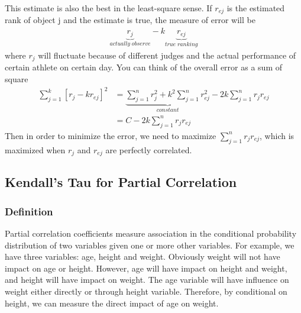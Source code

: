 \documentclass[twoside]{article}
\begin{document}
	This estimate is also the best in the least-square sense. If $r_{ej}$ is the estimated rank of object j and the estimate is true, the measure of error will be
	\begin{align*}
		\underbrace{r_j}_{actually \; observe} - k \underbrace{r_{ej}}_{true \; ranking}
	\end{align*}
	where $r_j$ will fluctuate because of different judges and the actual performance of certain athlete on certain day. You can think of the overall error as a sum of square
	\begin{align*}
		\sum_{j=1}^{k} \left[ r_j - k r_{ej} \right]^2 &= \underbrace{\sum_{j=1}^{n} r_j^2 + k^2 \sum_{j=1}^{n} r_{ej}^2}_{constant} - 2k \sum_{j=1}^{n} r_j r_{ej} \\
		&= C - 2k \sum_{j=1}^{n} r_j r_{ej}
	\end{align*}
	Then in order to minimize the error, we need to maximize $\sum_{j=1}^{n} r_j r_{ej}$, which is maximized when $r_j$ and $r_{ej}$ are perfectly correlated. 
	\subsection{Kendall's Tau for Partial Correlation}
	\subsubsection{Definition}
	Partial correlation coefficients measure association in the conditional probability distribution of two variables given one or more other variables. For example, we have three variables: age, height and weight. Obviously weight will not have impact on age or height. However, age will have impact on height and weight, and height will have impact on weight. The age variable will have influence on weight either directly or through height variable. Therefore, by conditional on height, we can measure the direct impact of age on weight. 
	
\end{document}
